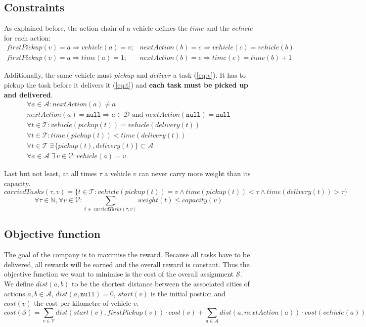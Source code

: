 \documentclass[11pt]{article}
\begin{document}
\subsection{Constraints}
As explained before, the action chain of a vehicle defines the $time$ 
and the $vehicle$ for each action:
\begin{eqnarray}
firstPickup(v) = a \Rightarrow vehicle(a) = v;  &
nextAction(b)  = c \Rightarrow vehicle(c) = vehicle(b)
\\
firstPickup(v) = a \Rightarrow time(a) = 1;  &
nextAction(b)  = c \Rightarrow time(c) = time(b) + 1
\end{eqnarray}

Additionally, the same vehicle must $pickup$ and $deliver$ a task (\ref{eq:v}). 
It has to pickup the task before it delivers it (\ref{eq:t})
and \textbf{each task must be picked up and delivered}.
\begin{eqnarray}
\forall a \in \mathcal{A}  :
nextAction(a) \neq a
\\
nextAction(a) = \mathtt{null} \Rightarrow a \in \mathcal{D}
\text{ and } nextAction(\mathtt{null}) = \mathtt{null}
\\
\label{eq:v}
\forall t \in \mathcal{T}: 
vehicle(pickup(t)) = vehicle(delivery(t)) 
\\
\label{eq:t}
\forall t \in \mathcal{T}: 
time(pickup(t)) < time(delivery(t))
\\
\forall t \in \mathcal{T} \; 
\exists  \, \{ pickup(t), delivery(t) \} \subset \mathcal{A} \;\;
\\
\forall a \in \mathcal{A} \;
\exists \, v \in \mathcal{V} : 
vehicle(a) = v
\end{eqnarray}

Last but not least, at all times $\tau$ a vehicle $v$ can never 
carry more weight than its capacity.
$$
carriedTasks(\tau, v) = \{t \in \mathcal{T}: 
vehicle(pickup(t)) = v \wedge 
time(pickup(t)) < \tau \wedge 
time(delivery(t)) > \tau \}
$$$$
\forall \tau \in \mathbb{N}, 
\forall v \in \mathcal{V}:
\sum_{t \, \in \, carriedTasks(\tau, v)} weight(t) \leq
capacity(v)
$$

\subsection{Objective function} 

The goal of the company is to maximise the reward. Because all tasks have to be
delivered, all rewards will be earned and the overall reward is constant. Thus
the objective function we want to minimise is the cost of the overall assignment
$\mathcal{S}$. We define $dist(a,b)$ to be the shortest distance between the
associated cities of actions $a,b \in \mathcal{A}$, $dist(a, \mathtt{null}) =
0$, $start(v)$ is the initial postion and $cost(v)$ the cost per kilometre of
vehicle $v$.
$$
cost(\mathcal{S}) = 
\sum_{v \in \mathcal{V}} dist(start(v), firstPickup(v))
\cdot cost(v)
 +
\sum_{a \in \mathcal{A}} dist(a, nextAction(a))
\cdot cost(vehicle(a))
$$
\end{document}
